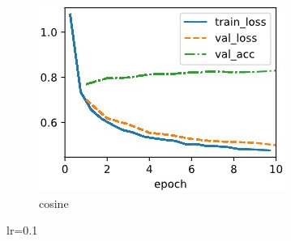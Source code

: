 \documentclass{article}
\begin{document}
\begin{figure}
\begin{subfigure}[b]{0.3\columnwidth}
      \includegraphics[width=\columnwidth]{img/lr0.1 cosine.jpg}
      \caption{cosine}
   \end{subfigure}
   \caption{lr=0.1}
      \label{lr-0.1}
\end{figure}
\end{document}
